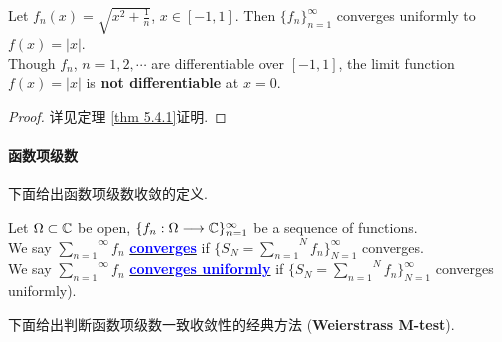 \begin{thm}
\begin{rmk}
\begin{itemize}
			\vspace{1em}
			
			\begin{example}\label{ex 6.2.1}
				Let $f_{n}(x) = \sqrt{x^2 + \frac{1}{n}}$, $x \in [-1 , 1]$. Then $\{ f_n \}_{n = 1}^{\infty}$ converges uniformly to $f(x) = \left| x \right|$. \\
				Though $f_n$, $n = 1 , 2 , \cdots$ are differentiable over $[-1 , 1]$, the limit function $f(x) = \left| x \right|$ is \textbf{not differentiable} at $x = 0$.
			\end{example}
		\end{itemize}
	\end{rmk}
	
	\vspace{2em}
	\begin{proof}
		详见定理 \ref{thm 5.4.1}证明.
	\end{proof}
\end{thm}

\newpage

\paragraph{函数项级数}
下面给出函数项级数收敛的定义.
\begin{defn}\label{def 6.2.1}
	Let $\Omega \subset \mathbb{C}$ be open, $\{ f_n : \Omega \longrightarrow \mathbb{C} \}_{n = 1}^{\infty}$ be a sequence of functions. \\
	We say $\overset{\infty}{\underset{n = 1}{\sum}}{f_n}$ \underline{\textcolor{blue}{\textbf{converges}}} if $\{ S_{N} = \overset{N}{\underset{n = 1}{\sum}}{f_n} \}_{N = 1}^{\infty}$ converges.  \\
	We say $\overset{\infty}{\underset{n = 1}{\sum}}{f_n}$ \underline{\textcolor{blue}{\textbf{converges uniformly}}} if $\{ S_{N} = \overset{N}{\underset{n = 1}{\sum}}{f_n} \}_{N = 1}^{\infty}$ converges uniformly).
\end{defn}

\vspace{2em}
下面给出判断函数项级数一致收敛性的经典方法 (\textbf{Weierstrass M-test}).

